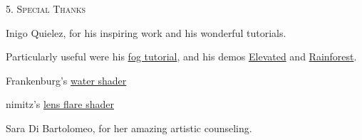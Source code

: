 \documentclass[a4paper,10pt]{article} %
\newcommand{\tsection}[1]{%
    {\center \bigbreak \par \hfil \huge \textsc {#1}} \bigbreak \par}
\begin{document}
\tsection{5. Special Thanks}

Inigo Quielez, for his inspiring work and his wonderful tutorials. 

Particularly useful were his \href{http://www.iquilezles.org/www/articles/fog/fog.htm}{fog tutorial}, 
and his demos \href{https://www.shadertoy.com/view/MdX3Rr}{Elevated} and \href{https://www.shadertoy.com/view/4ttSWf}{Rainforest}.

Frankenburg's \href{https://www.shadertoy.com/view/4sXGRM}{water shader} 

nimitz's \href{https://www.shadertoy.com/view/XtS3DD}{lens flare shader}

Sara Di Bartolomeo, for her amazing artistic counseling. 
\end{document}
